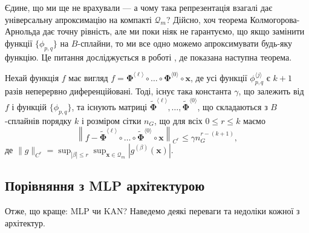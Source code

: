 Єдине, що ми ще не врахували --- а чому така репрезентація взагалі дає універсальну 
апроксимацію на компакті $\mathcal{Q}_m$? Дійсно, хоч теорема Колмогорова-Арнольда
дає точну рівність, але ми поки ніяк не гарантуємо, що якщо замінити функції 
$\{\phi_{p,q}\}$ на $B$-сплайни, то ми все одно можемо апроксимувати будь-яку
функцію. Це питання досліджується в роботі \cite{kan}, де показана наступна теорема.

\begin{theorem}
	Нехай функція $f$ має вигляд $f = \boldsymbol{\Phi}^{\langle\ell\rangle}
	\circ \dots \circ \boldsymbol{\Phi}^{\langle 0\rangle} \circ \mathbf{x}$, де
	усі функції $\phi_{p,q}^{\langle j \rangle}$ є $k+1$ разів неперервно
	диференційовані. Тоді, існує така константа $\gamma$, що залежить від $f$ і
	функцій $\{\phi_{p,q}\}$, та існують матриці
	$\widetilde{\boldsymbol{\Phi}}^{\langle\ell\rangle},\dots,\widetilde{\boldsymbol{\Phi}}^{\langle
	0\rangle}$, що складаються з $B$-сплайнів порядку $k$ і розміром сітки $n_G$, що
	для всіх $0 \leq r \leq k$ маємо
	\begin{equation*}
		\left\| f - \widetilde{\boldsymbol{\Phi}}^{\langle\ell\rangle}
		\circ \dots \circ \widetilde{\boldsymbol{\Phi}}^{\langle 0\rangle} \circ \mathbf{x} \right\|_{C^r} \leq \gamma n_G^{r-(k+1)},
	\end{equation*}
	де $\|g\|_{C^r} = \sup_{|\beta|\leq r}\sup_{\mathbf{x} \in \mathcal{Q}_m}|g^{(\beta)}(\mathbf{x})|$.
\end{theorem}

\subsection{Порівняння з MLP архітектурою}

Отже, що краще: MLP чи KAN? Наведемо деякі переваги та недоліки кожної з архітектур.

